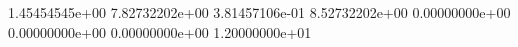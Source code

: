  1.45454545e+00
 7.82732202e+00
 3.81457106e-01
 8.52732202e+00
 0.00000000e+00
 0.00000000e+00
 0.00000000e+00
 1.20000000e+01
